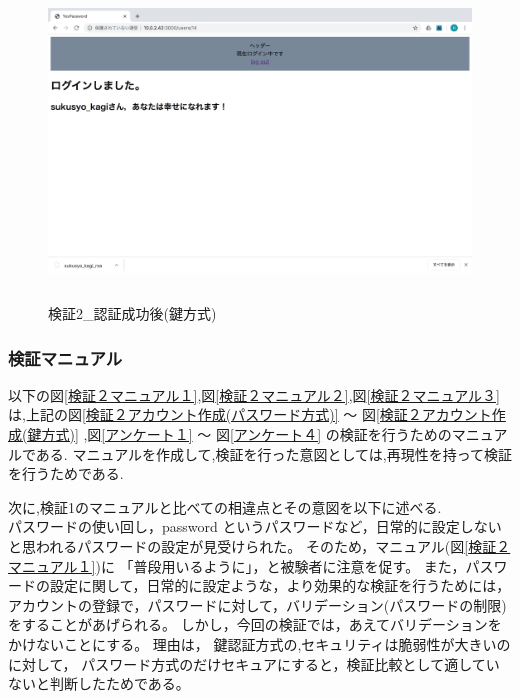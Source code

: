     \vspace{4cm}%
    \begin{figure}[H]
        \includegraphics[height=8.4cm]{./fig/chapter4/inspect_2/key_screnn/login-after2.png}
        \caption{検証2\_認証成功後(鍵方式)}
        \label{検証２認証成功後(鍵方式)}
    \end{figure}









   
    \newpage


    \subsubsection{検証マニュアル}
    以下の図\ref{検証２マニュアル１},図\ref{検証２マニュアル２},図\ref{検証２マニュアル３}は,上記の図\ref{検証２アカウント作成(パスワード方式)} 〜 図\ref{検証２アカウント作成(鍵方式)} ,図\ref{アンケート１} 〜 図\ref{アンケート４}
    の検証を行うためのマニュアルである.
    マニュアルを作成して,検証を行った意図としては,再現性を持って検証を行うためである.

    次に,検証1のマニュアルと比べての相違点とその意図を以下に述べる.\\
    パスワードの使い回し，password というパスワードなど，日常的に設定しないと思われるパスワードの設定が見受けられた。
    そのため，マニュアル(図\ref{検証２マニュアル１})に 「普段用いるように」，と被験者に注意を促す。
    また，パスワードの設定に関して，日常的に設定ような，より効果的な検証を行うためには，
    アカウントの登録で，パスワードに対して，バリデーション(パスワードの制限)をすることがあげられる。
    しかし，今回の検証では，あえてバリデーションをかけないことにする。
    理由は，
        鍵認証方式の,セキュリティは脆弱性が大きいのに対して，
        パスワード方式のだけセキュアにすると，検証比較として適していないと判断したためである。

